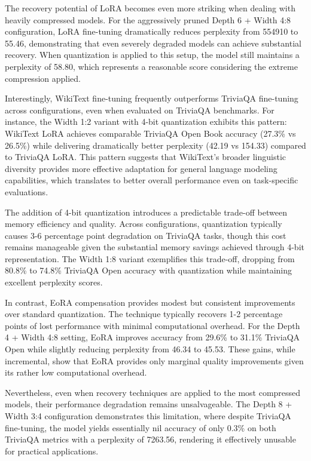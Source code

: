 The recovery potential of LoRA becomes even more striking when dealing with heavily compressed models. For the aggressively pruned Depth 6 + Width 4:8 configuration, LoRA fine-tuning dramatically reduces perplexity from 554910 to 55.46, demonstrating that even severely degraded models can achieve substantial recovery. When quantization is applied to this setup, the model still maintains a perplexity of 58.80, which represents a reasonable score considering the extreme compression applied.

Interestingly, WikiText fine-tuning frequently outperforms TriviaQA fine-tuning across configurations, even when evaluated on TriviaQA benchmarks. For instance, the Width 1:2 variant with 4-bit quantization exhibits this pattern: WikiText LoRA achieves comparable TriviaQA Open Book accuracy (27.3\% vs 26.5\%) while delivering dramatically better perplexity (42.19 vs 154.33) compared to TriviaQA LoRA. This pattern suggests that WikiText's broader linguistic diversity provides more effective adaptation for general language modeling capabilities, which translates to better overall performance even on task-specific evaluations.

The addition of 4-bit quantization introduces a predictable trade-off between memory efficiency and quality. Across configurations, quantization typically causes 3-6 percentage point degradation on TriviaQA tasks, though this cost remains manageable given the substantial memory savings achieved through 4-bit representation. The Width 1:8 variant exemplifies this trade-off, dropping from 80.8\% to 74.8\% TriviaQA Open accuracy with quantization while maintaining excellent perplexity scores.

In contrast, EoRA compensation provides modest but consistent improvements over standard quantization. The technique typically recovers 1-2 percentage points of lost performance with minimal computational overhead. For the Depth 4 + Width 4:8 setting, EoRA improves accuracy from 29.6\% to 31.1\% TriviaQA Open while slightly reducing perplexity from 46.34 to 45.53. These gains, while incremental, show that EoRA provides only marginal quality improvements given its rather low computational overhead.

Nevertheless, even when recovery techniques are applied to the most compressed models, their performance degradation remains unsalvageable. The Depth 8 + Width 3:4 configuration demonstrates this limitation, where despite TriviaQA fine-tuning, the model yields essentially nil accuracy of only 0.3\% on both TriviaQA metrics with a perplexity of 7263.56, rendering it effectively unusable for practical applications.